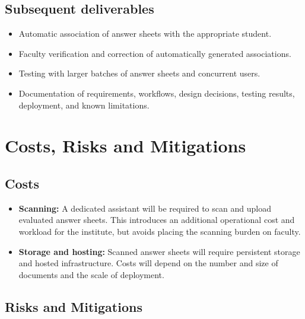 \documentclass[11pt,a4paper]{article}
\begin{document}
\subsection{Subsequent deliverables}
\begin{itemize}[leftmargin=0.7cm]
    \item Automatic association of answer sheets with the appropriate student.
    \item Faculty verification and correction of automatically generated associations.
    \item Testing with larger batches of answer sheets and concurrent users.
    \item Documentation of requirements, workflows, design decisions, testing results, deployment, and known limitations.
\end{itemize}

\section{Costs, Risks and Mitigations}
\subsection{Costs}
\begin{itemize}[leftmargin=0.7cm]
    \item \textbf{Scanning:} A dedicated assistant will be required to scan and upload evaluated answer sheets. This introduces an additional operational cost and workload for the institute, but avoids placing the scanning burden on faculty.
    \item \textbf{Storage and hosting:} Scanned answer sheets will require persistent storage and hosted infrastructure. Costs will depend on the number and size of documents and the scale of deployment.
\end{itemize}

\subsection{Risks and Mitigations}
\end{document}
